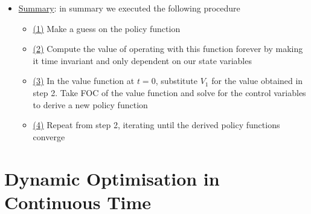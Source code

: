 \documentclass{article}
\begin{document}
\begin{itemize}
    \item  \underline{Summary}: in summary we executed the following procedure
    \begin{itemize}
        \item  \underline{(1)} Make a guess on the policy function
        \item  \underline{(2)} Compute the value of operating with this function forever by making it time invariant and only dependent on our state variables
        \item  \underline{(3)} In the value function at $t=0$, substitute $V_{1}$ for the value obtained in step 2. Take FOC of the value function and solve for the control variables to derive a new policy function
        \item  \underline{(4)} Repeat from step 2, iterating until the derived policy functions converge
    \end{itemize}
\end{itemize}


\newpage

\section{Dynamic Optimisation in Continuous Time}
\end{document}
